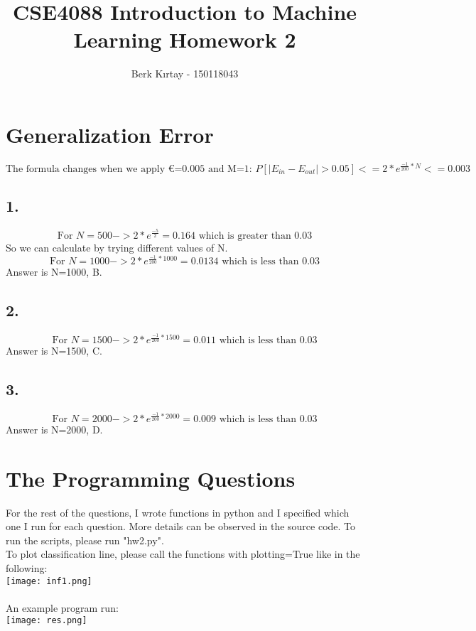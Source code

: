 \documentclass{homework}
\title
{
CSE4088 Introduction to Machine Learning 
Homework 2
}
\date{}
\author{Berk Kırtay - 150118043}
\begin{document}
\maketitle

\section*{Generalization Error}
\[
\text{The formula changes when we apply €=0.005 and M=1: }
P[|E_{in} - E_{out}| > 0.05] <= 2*e^{\frac{-1}{200}*N} <= 0.003
\]
\subsection*{1.}
\[
 \text{For } N=500 -> 2*e^{\frac{-5}{2}} = 0.164  \text{ which is greater than 0.03}
\]
So we can calculate by trying different values of N.
\[
 \text{For } N=1000 -> 2*e^{\frac{-1}{200}*1000} = 0.0134  \text{ which is less than 0.03}
\]
Answer is N=1000, B.

\subsection*{2.}
\[
 \text{For } N=1500 -> 2*e^{\frac{-1}{200}*1500} = 0.011  \text{ which is less than 0.03}
\]
Answer is N=1500, C.

\subsection*{3.}
\[
 \text{For } N=2000 -> 2*e^{\frac{-1}{200}*2000} = 0.009  \text{ which is less than 0.03}
\]
Answer is N=2000, D.

\section*{The Programming Questions}
For the rest of the questions, I wrote functions in python and I specified which one I run for each question. More details can be observed in the source code. To run the scripts, please run "hw2.py".\\
To plot classification line, please call the functions with plotting=True like in the following:\\
\texttt{[image: inf1.png]} \\\\

An example program run:\\
\texttt{[image: res.png]} \\\\
\end{document}
